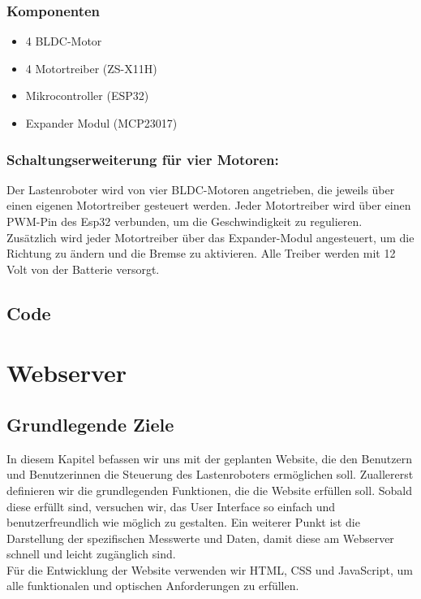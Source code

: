 \documentclass[ngerman,12pt,a4paper]{article}
\begin{document}
			\subsubsection{Komponenten}
			\begin{itemize}
				\item 4 BLDC-Motor
				\item 4 Motortreiber (ZS-X11H)
				\item Mikrocontroller (ESP32)
				\item Expander Modul (MCP23017)
			\end{itemize}
			\newpage
			
			\subsubsection{Schaltungserweiterung für vier Motoren:}
			Der Lastenroboter wird von vier BLDC-Motoren angetrieben, die jeweils über einen eigenen Motortreiber gesteuert werden. Jeder Motortreiber wird über einen PWM-Pin des Esp32 verbunden, um die Geschwindigkeit zu regulieren. Zusätzlich wird jeder Motortreiber über das Expander-Modul angesteuert, um die Richtung zu ändern und die Bremse zu aktivieren. Alle Treiber werden mit 12 Volt von der Batterie versorgt. \\[0.5cm]
			
			
		\subsection{Code} %
\newpage
	\section{Webserver} %
	 
		\subsection{Grundlegende Ziele}
	In diesem Kapitel befassen wir uns mit der geplanten Website, die den Benutzern und Benutzerinnen die Steuerung des Lastenroboters ermöglichen soll. Zuallererst definieren wir die grundlegenden Funktionen, die die Website erfüllen soll. Sobald diese erfüllt sind, versuchen wir, das User Interface so einfach und benutzerfreundlich wie möglich zu gestalten. Ein weiterer Punkt ist die Darstellung der spezifischen Messwerte und Daten, damit diese am Webserver schnell und leicht zugänglich sind.\\[0.5cm]
	Für die Entwicklung der Website verwenden wir HTML, CSS und JavaScript, um alle funktionalen und optischen Anforderungen zu erfüllen.  
	
\end{document}
